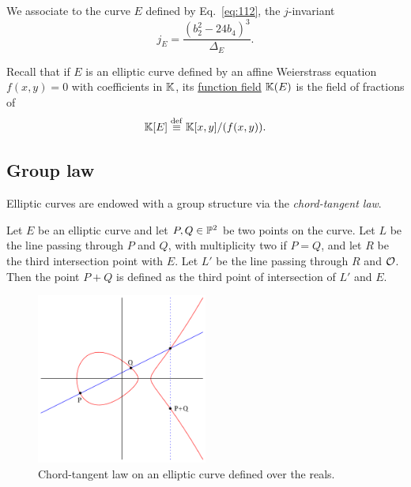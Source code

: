 \begin{definition}[$j$-invariant]
  We associate to the curve $E$ defined by Eq.~\eqref{eq:112}, the
  $j$-invariant
 \[j_E = \frac{(b_2^2-24b_4)^3}{\Delta_E}\text{.}\]
\end{definition}

\begin{nota}
  Recall that if $E$ is an elliptic curve defined by an affine
  Weierstrass equation $f(x,y)=0$ with coefficients in $\mathbb{K}$, its
  \hyperref[sec:algebraic-varieties]{function field} $\mathbb{K}(E)$ is the
  field of fractions of
  \begin{equation}
    \label{eq:125}
    \mathbb{K}[E]\overset{\mathrm{def}}{\equiv}\mathbb{K}[x,y]/(f(x,y))
    \text{.}
  \end{equation}
\end{nota}


\subsection{Group law}
\label{sec:group-law}
  Elliptic curves are
endowed with a group structure via the
\emph{chord-tangent law}.

\begin{definition}
  Let $E$ be an elliptic curve and let $P,Q\in\mathbb{P}^2$ be two points
  on the curve. Let $L$ be the line passing through $P$ and $Q$, with
  multiplicity two if $P=Q$, and let $R$ be the third intersection
  point with $E$.  Let $L'$ be the line passing through $R$ and
  $\mathcal{O}$. Then the point $P+Q$ is defined as the third point of
  intersection of $L'$ and $E$.
\end{definition}

\begin{figure}[ht]
  \centering
  \includegraphics[width=0.5\textwidth]{isogeny/ec-add}
  \caption{Chord-tangent law on an elliptic curve defined over the reals.}
  \label{fig:chord-tangent}
\end{figure}

